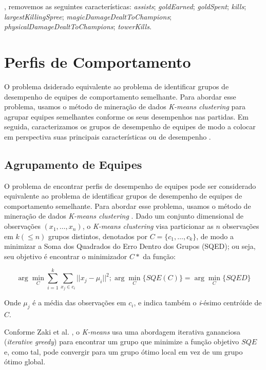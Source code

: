 , removemos as seguintes características: \textit{assists}; \textit{goldEarned}; \textit{goldSpent}; \textit{kills}; \textit{largestKillingSpree}; \textit{magicDamageDealtToChampions}; \textit{physicalDamageDealtToChampions}; \textit{towerKills}.

\chapter{Perfis de Comportamento} \label{cap:perfiscomportamento}

O problema dsiderado equivalente ao problema de identificar grupos de desempenho de equipes de comportamento semelhante. Para abordar esse problema, usamos o método de mineração de dados \textit{K-means clustering} \cite{zaki2014data} para agrupar equipes semelhantes conforme os seus desempenhos nas partidas. Em seguida, caracterizamos  os grupos de desempenho de equipes de modo a colocar em perspectiva suas principais características ou  de desempenho .

\section{Agrupamento de Equipes} \label{agrupamentoequipes}
O problema de encontrar perfis de desempenho de equipes pode ser considerado equivalente ao problema de identificar grupos de desempenho de equipes de comportamento semelhante. Para abordar esse problema, usamos o método de mineração de dados \textit{K-means clustering} \cite{zaki2014data}. Dado um conjunto dimensional de observações $(x_{1}, \ldots, x_{n} )$, o \textit{K-means clustering} visa particionar as $n$ observações em $k (\leq n)$ grupos distintos, denotados por $ C = \{c_1, \ldots , c_k \} $, de modo a minimizar a Soma dos Quadrados do Erro Dentro dos Grupos (SQED); ou seja, seu objetivo é encontrar o minimizador $C*$ da função:

\begin{displaymath}
  \arg\min_{C} \sum_{i=1}^{k} \sum_{x_j \in c_i}{} || x_j - \mu _i ||^2; \arg\min_{C} \{SQE(C)\} = \arg\min_{C} \{SQED\}
\end{displaymath}

Onde $\mu_j$ é a média das observações em $c_i$, e indica também o \textit{i}-ésimo centróide de $C$.

Conforme Zaki et al. \cite{zaki2014data}, o \textit{K-means} usa uma abordagem iterativa gananciosa (\textit{iterative greedy}) para encontrar um grupo que minimize a função objetivo $SQE$ e, como tal, pode convergir para um grupo ótimo local em vez de um grupo ótimo global.

